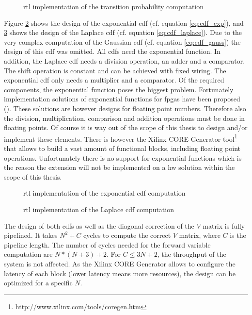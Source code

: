 \documentclass[mscthesis]{usiinfthesis}
\begin{document}
\begin{figure}
    \centering
    
    \caption{\acrshort{rtl} implementation of the transition probability
        computation}
    \label{fig:arch_ext}
\end{figure}

Figure \ref{fig:arch_cdf1} shows the design of the exponential \gls{cdf} (cf.
equation \ref{eq:cdf_exp}), and \ref{fig:arch_cdf2} shows the design of the
Laplace \gls{cdf} (cf. equation \ref{eq:cdf_laplace}). Due to the very complex
computation of the Gaussian \gls{cdf} (cf. equation \ref{eq:cdf_gauss}) the
design of this \gls{cdf} was omitted. All \glspl{cdf} need the exponential
function. In addition, the Laplace \gls{cdf} needs a division operation, an
adder and a comparator. The shift operation is constant and can be achieved
with fixed wiring. The exponential \gls{cdf} only needs a multiplier and
a comparator. Of the required components, the exponential function poses the
biggest problem. Fortunately implementation solutions of exponential functions
for \glspl{fpga} have been proposed (\cite{RSSI08_Pottathuparambil,
ICFPT05_Detrey}). These solutions are however designs for floating point
numbers. Therefore also the division, multiplication, comparison and addition
operations must be done in floating points. Of course it is way out of the
scope of this thesis to design and/or implement these elements. There is
however the Xilinx CORE Generator
tool\footnote{http://www.xilinx.com/tools/coregen.htm} that allows to build
a vast amount of functional blocks, including floating point operations.
Unfortunately there is no support for exponential functions which is the reason
the extension will not be implemented on a \gls{hw} solution within the scope
of this thesis.

\begin{figure}
    \centering
    
    \caption{\acrshort{rtl} implementation of the exponential \acrshort{cdf}
        computation}
    \label{fig:arch_cdf1}
\end{figure}

\begin{figure}
    \centering
    
    \caption{\acrshort{rtl} implementation of the Laplace \acrshort{cdf}
        computation}
    \label{fig:arch_cdf2}
\end{figure}

The design of both \glspl{cdf} as well as the diagonal correction of the $V$
matrix is fully pipelined. It takes $N^2+C$ cycles to compute the correct $V$
matrix, where $C$ is the pipeline length. The number of cycles needed for the
forward variable computation are $N*(N+3)+2$. For $C \leq 3N+2$, the throughput
of the system is not affected. As the Xilinx CORE Generator allows to configure
the latency of each block (lower latency means more resources), the design can
be optimized for a specific $N$.
\end{document}
